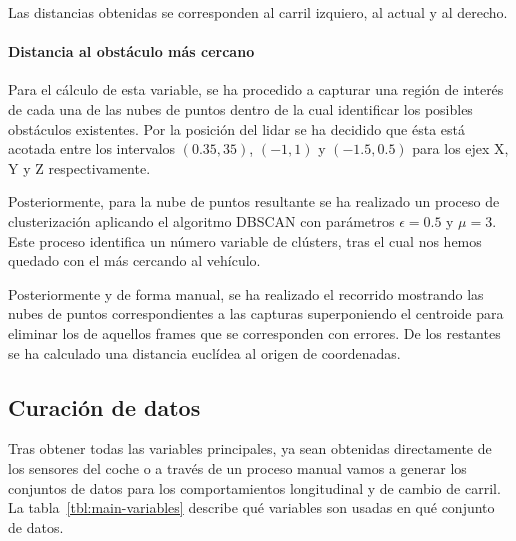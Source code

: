 Las distancias obtenidas se corresponden al carril izquiero, al actual y al derecho.

\paragraph{Distancia al obstáculo más cercano}

Para el cálculo de esta variable, se ha procedido a capturar una región de interés de cada una de las nubes de puntos dentro de la cual identificar los posibles obstáculos existentes. Por la posición del lidar se ha decidido que ésta está acotada entre los intervalos $(0.35, 35)$, $(-1, 1)$ y $(-1.5, 0.5)$ para los ejex X, Y y Z respectivamente.

Posteriormente, para la nube de puntos resultante se ha realizado un proceso de clusterización aplicando el algoritmo DBSCAN con parámetros $\epsilon = 0.5$ y $\mu = 3$. Este proceso identifica un número variable de clústers, tras el cual nos hemos quedado con el más cercando al vehículo.

Posteriormente y de forma manual, se ha realizado el recorrido mostrando las nubes de puntos correspondientes a las capturas superponiendo el centroide para eliminar los de aquellos frames que se corresponden con errores. De los restantes se ha calculado una distancia euclídea al origen de coordenadas.

\subsection{Curación de datos}

Tras obtener todas las variables principales, ya sean obtenidas directamente de los sensores del coche o a través de un proceso manual vamos a generar los conjuntos de datos para los comportamientos longitudinal y de cambio de carril. La tabla~\ref{tbl:main-variables} describe qué variables son usadas en qué conjunto de datos.

